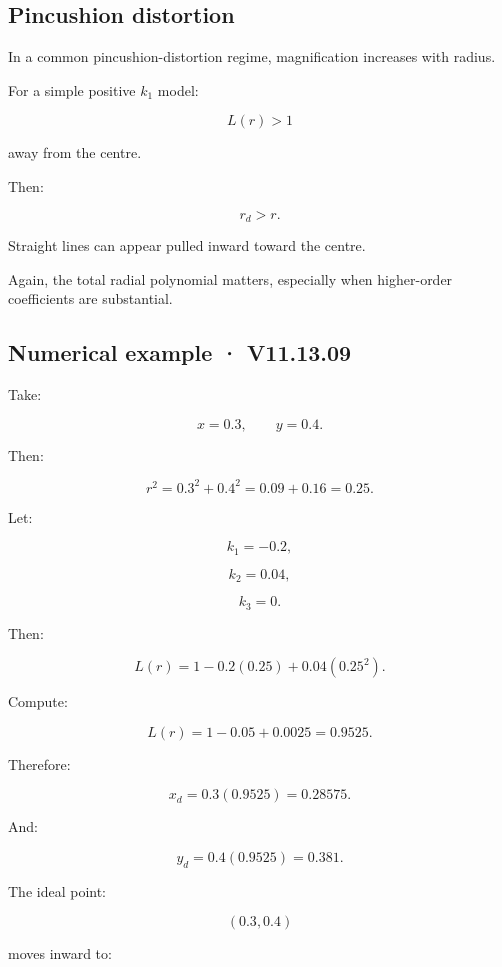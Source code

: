 \subsection{Pincushion distortion}\label{02-foundations-ii-ch035-pincushion-distortion}

\hypertarget{02-foundations-ii-ch035-pincushion-distortion}{}

In a common pincushion-distortion regime, magnification increases with radius.

For a simple positive \(k_1\) model:

\[
 L(r)>1
\]

away from the centre.

Then:

\[
 r_d>r.
\]

Straight lines can appear pulled inward toward the centre.

Again, the total radial polynomial matters, especially when higher-order coefficients are substantial.

\subsection{Numerical example · V11.13.09}\label{02-foundations-ii-ch035-numerical-example-v11.13.09}

\hypertarget{02-foundations-ii-ch035-numerical-example-v11.13.09}{}

Take:

\[
 x=0.3,\qquad y=0.4.
\]

Then:

\[
 r^2=0.3^2+0.4^2 =0.09+0.16 =\boxed{0.25}.
\]

Let:

\[
 k_1=-0.2,
\]

\[
 k_2=0.04,
\]

\[
 k_3=0.
\]

Then:

\[
 L(r)=1-0.2(0.25)+0.04(0.25^2).
\]

Compute:

\[
 L(r)=1-0.05+0.0025 =\boxed{0.9525}.
\]

Therefore:

\[
 x_d=0.3(0.9525) =\boxed{0.28575}.
\]

And:

\[
 y_d=0.4(0.9525) =\boxed{0.381}.
\]

The ideal point:

\[
 (0.3,0.4)
\]

moves inward to:

